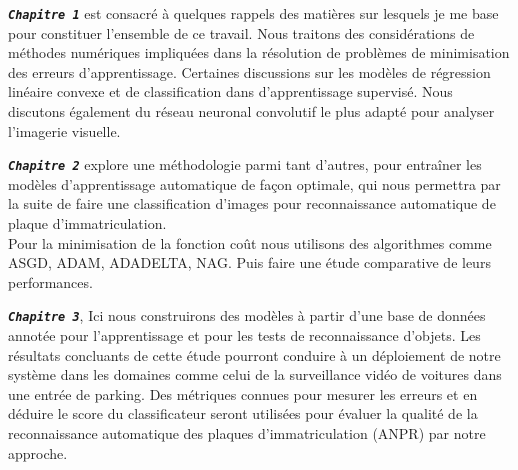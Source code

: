 		\begin{list}{}{En dehors de cette introduction, la partie conclusive et l'annexe, ce mémoire est organisé en quatre chapitres comme suit.}
			\item \textbf{\textsl{\texttt{Chapitre 1}}} est consacré à quelques rappels des matières sur lesquels je me base pour constituer l'ensemble de ce travail.  Nous traitons des considérations de méthodes numériques impliquées dans la résolution de problèmes de minimisation des erreurs d’apprentissage. Certaines discussions sur les modèles de régression linéaire convexe et de classification dans d’apprentissage supervisé. Nous discutons également du réseau neuronal convolutif le plus adapté pour analyser l'imagerie visuelle.
			
			\item \textbf{\textsl{\texttt{Chapitre 2}}} explore une méthodologie parmi tant d’autres, pour entraîner les modèles d’apprentissage automatique de façon optimale, qui nous permettra par la suite de faire une classification d’images pour reconnaissance automatique de plaque d'immatriculation.\\
			Pour la minimisation de la fonction coût nous utilisons des algorithmes comme ASGD, ADAM, ADADELTA, NAG. Puis faire une étude comparative de leurs performances. 
			
			\item \textbf{\textsl{\texttt{Chapitre 3}}}, Ici nous construirons des modèles à partir d’une base de données annotée pour l'apprentissage et pour les tests de reconnaissance d'objets. Les résultats concluants de cette étude pourront conduire à un déploiement de notre système dans les domaines comme  celui de la surveillance vidéo de voitures dans une entrée de parking. Des métriques connues pour mesurer les erreurs et en déduire le score du classificateur seront utilisées pour évaluer la qualité de la reconnaissance automatique des plaques d’immatriculation (ANPR) par notre approche.
		\end{list}
	
	

		
		
		
		